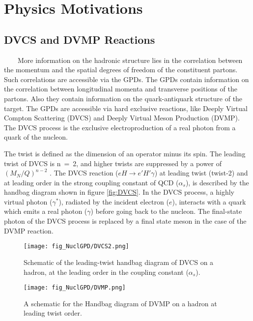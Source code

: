 
\chapter{Physics Motivations}
\label{chap:physics}

\section{DVCS and DVMP Reactions}
~~~~More information on the hadronic structure lies in the correlation between 
the momentum and the spatial degrees of freedom of the constituent partons.  
Such correlations are accessible via the GPDs. The GPDs contain information on 
the correlation between longitudinal momenta and transverse positions of the 
partons. Also they contain information on the quark-antiquark structure of the 
target. The GPDs are accessible via hard exclusive reactions, like Deeply 
Virtual Compton Scattering (DVCS) and Deeply Virtual Meson Production (DVMP).  
The DVCS process is the exclusive electroproduction of a real photon from a 
quark of the nucleon.

The twist is defined as the dimension of an operator minus its spin. The 
leading twist of DVCS is n~=~2, and higher twists are suppressed by a power of 
$(M_{N}/Q)^{n-2}$ \cite{twist_def}. The DVCS reaction ($eH\rightarrow 
e'H'\gamma$) at leading twist (twist-2) and at leading order in the strong 
coupling constant of QCD ($\alpha _{s}$), is described by the handbag diagram 
shown in figure \ref{fig:DVCS}. In the DVCS process, a highly virtual photon 
($\gamma^{*}$), radiated by the incident electron ($e$), interacts with a quark 
which emits a real photon ($\gamma$) before going back to the nucleon. The 
final-state photon of the DVCS process is replaced by a final state meson in 
the case of the DVMP reaction.

\begin{figure}[t]
\begin{minipage}[c]{.46\linewidth}
\vspace{-0.2in}
\centering
\texttt{[image: fig\_NuclGPD/DVCS2.png]}
\caption{Schematic of the leading-twist handbag diagram of DVCS on a hadron, at 
the leading order in the coupling constant ($\alpha _{s}$).} \label{fig:DVCS}
\end{minipage} \hfill
\begin{minipage}[c]{.46\linewidth}
\texttt{[image: fig\_NuclGPD/DVMP.png]}
\caption{A schematic for the Handbag diagram of DVMP on a hadron at leading 
twist order.}
\label{fig:DVMP}
\end{minipage}
\end{figure}
    
